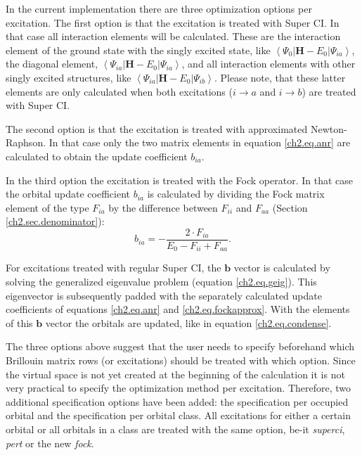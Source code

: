 In the current implementation there are three optimization options per excitation. The first option is that the excitation is treated with Super CI. In that case all interaction elements will be calculated. These are the interaction element of the ground state with the singly excited state, like $\left < \Psi_{0} | \mathbf{H} - E_0 | \Psi_{ia} \right >$, the diagonal element, $\left < \Psi_{ia} | \mathbf{H} - E_0 | \Psi_{ia} \right >$, and all interaction elements with other singly excited structures, like $\left < \Psi_{ia} | \mathbf{H} - E_0 | \Psi_{ib} \right >$. Please note, that these latter elements are only calculated when both excitations ($i \rightarrow a$ and $i \rightarrow b$) are treated with Super CI.

The second option is that the excitation is treated with approximated Newton-Raphson. In that case only the two matrix elements in equation \ref{ch2.eq.anr} are calculated to obtain the update coefficient $b_{ia}$.

In the third option the excitation is treated with the Fock operator. In that case the orbital update coefficient $b_{ia}$ is calculated by dividing the Fock matrix element of the type $F_{ia}$ by the difference between $F_{ii}$ and $F_{aa}$ (Section \ref{ch2.sec.denominator}):
\begin{equation}
b_{ia}= - \frac{2 \cdot F_{ia}}{E_0 - F_{ii} + F_{aa}}.
\label{ch2.eq.fockapprox}
\end{equation}

For excitations treated with regular Super CI, the $\mathbf{b}$ vector is calculated by solving the generalized eigenvalue problem (equation \ref{ch2.eq.geig}). This eigenvector is subsequently padded with the separately calculated update coefficients of equations \ref{ch2.eq.anr} and \ref{ch2.eq.fockapprox}. With the elements of this $\mathbf{b}$ vector the orbitals are updated, like in equation \ref{ch2.eq.condense}.

The three options above suggest that the user needs to specify beforehand which Brillouin matrix rows (or excitations) should be treated with which option. Since the virtual space is not yet created at the beginning of the calculation it is not very practical to specify the optimization method per excitation. Therefore, two additional specification options have been added: the specification per occupied orbital and the specification per orbital class. All excitations for either a certain orbital or all orbitals in a class are treated with the same option, be-it \textit{superci}, \textit{pert} or the new \textit{fock}.

